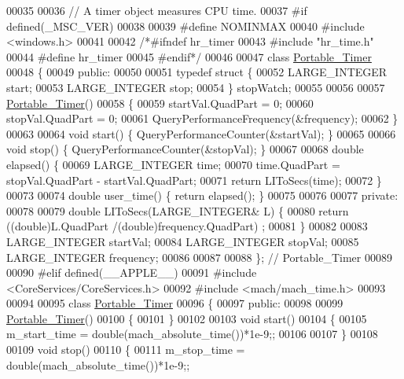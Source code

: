 \begin{DoxyCode}
00035 
00036 \textcolor{comment}{//  A timer object measures CPU time.}
00037 \textcolor{preprocessor}{#if defined(\_MSC\_VER)}
00038 
00039 \textcolor{preprocessor}{#define NOMINMAX}
00040 \textcolor{preprocessor}{#include <windows.h>}
00041 
00042 \textcolor{comment}{/*#ifndef hr\_timer}
00043 \textcolor{comment}{#include "hr\_time.h"}
00044 \textcolor{comment}{#define hr\_timer}
00045 \textcolor{comment}{#endif*/}
00046 
00047  \textcolor{keyword}{class }\hyperlink{class_portable___timer}{Portable\_Timer}
00048  \{
00049   \textcolor{keyword}{public}:
00050 
00051    \textcolor{keyword}{typedef} \textcolor{keyword}{struct }\{
00052     LARGE\_INTEGER start;
00053     LARGE\_INTEGER stop;
00054    \} stopWatch;
00055 
00056 
00057    \hyperlink{class_portable___timer}{Portable\_Timer}()
00058    \{
00059      startVal.QuadPart = 0;
00060      stopVal.QuadPart = 0;
00061      QueryPerformanceFrequency(&frequency);
00062    \}
00063 
00064    \textcolor{keywordtype}{void} start() \{ QueryPerformanceCounter(&startVal); \}
00065 
00066    \textcolor{keywordtype}{void} stop() \{ QueryPerformanceCounter(&stopVal); \}
00067 
00068    \textcolor{keywordtype}{double} elapsed() \{
00069      LARGE\_INTEGER time;
00070      time.QuadPart = stopVal.QuadPart - startVal.QuadPart;
00071      \textcolor{keywordflow}{return} LIToSecs(time);
00072    \}
00073 
00074    \textcolor{keywordtype}{double} user\_time() \{ \textcolor{keywordflow}{return} elapsed(); \}
00075 
00076 
00077  \textcolor{keyword}{private}:
00078 
00079    \textcolor{keywordtype}{double} LIToSecs(LARGE\_INTEGER& L) \{
00080      \textcolor{keywordflow}{return} ((\textcolor{keywordtype}{double})L.QuadPart /(\textcolor{keywordtype}{double})frequency.QuadPart) ;
00081    \}
00082 
00083    LARGE\_INTEGER startVal;
00084    LARGE\_INTEGER stopVal;
00085    LARGE\_INTEGER frequency;
00086 
00087 
00088  \}; \textcolor{comment}{// Portable\_Timer}
00089 
00090 \textcolor{preprocessor}{#elif defined(\_\_APPLE\_\_)}
00091 \textcolor{preprocessor}{#include <CoreServices/CoreServices.h>}
00092 \textcolor{preprocessor}{#include <mach/mach\_time.h>}
00093 
00094 
00095 \textcolor{keyword}{class }\hyperlink{class_portable___timer}{Portable\_Timer}
00096 \{
00097  \textcolor{keyword}{public}:
00098 
00099   \hyperlink{class_portable___timer}{Portable\_Timer}()
00100   \{
00101   \}
00102 
00103   \textcolor{keywordtype}{void} start()
00104   \{
00105     m\_start\_time = double(mach\_absolute\_time())*1e-9;;
00106 
00107   \}
00108 
00109   \textcolor{keywordtype}{void} stop()
00110   \{
00111     m\_stop\_time = double(mach\_absolute\_time())*1e-9;;

\end{DoxyCode}
